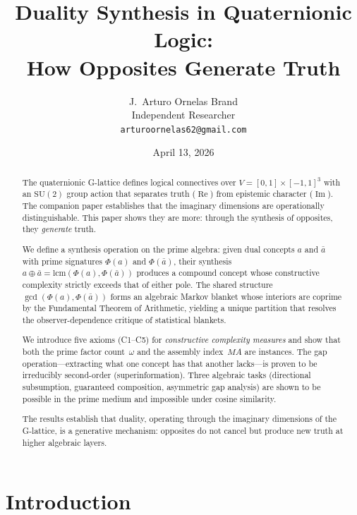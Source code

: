 \documentclass[11pt,a4paper]{article}
\title{Duality Synthesis in Quaternionic Logic:\\
How Opposites Generate Truth}
\author{J.~Arturo Ornelas Brand\\
  \small Independent Researcher\\
  \small \texttt{arturoornelas62@gmail.com}}
\date{April 13, 2026}
\newcommand{\Real}{\operatorname{Re}}
\newcommand{\Imag}{\operatorname{Im}}
\newcommand{\SU}{\mathrm{SU}(2)}
\begin{document}
\maketitle

\begin{abstract}
The quaternionic G-lattice defines logical connectives over
$V=[0,1]\times[-1,1]^3$ with an $\SU$ group action that separates
truth ($\Real$) from epistemic character ($\Imag$). The companion
paper establishes that the imaginary dimensions are operationally
distinguishable. This paper shows they are more: through the
synthesis of opposites, they \emph{generate} truth.

We define a synthesis operation on the prime algebra: given dual
concepts $a$ and $\bar{a}$ with prime signatures $\Phi(a)$ and
$\Phi(\bar{a})$, their synthesis
$a\oplus\bar{a}=\mathrm{lcm}(\Phi(a),\Phi(\bar{a}))$ produces a
compound concept whose constructive complexity strictly exceeds that
of either pole. The shared structure $\gcd(\Phi(a),\Phi(\bar{a}))$
forms an algebraic Markov blanket whose interiors are coprime by
the Fundamental Theorem of Arithmetic, yielding a unique partition
that resolves the observer-dependence critique of statistical blankets.

We introduce five axioms (C1--C5) for \emph{constructive complexity
measures} and show that both the prime factor count~$\omega$ and the
assembly index~$MA$ are instances. The gap
operation---extracting what one concept has that another lacks---is
proven to be irreducibly second-order (superinformation). Three
algebraic tasks (directional subsumption, guaranteed composition,
asymmetric gap analysis) are shown to be possible in the prime
medium and impossible under cosine similarity.

The results establish that duality, operating through the imaginary
dimensions of the G-lattice, is a generative mechanism: opposites
do not cancel but produce new truth at higher algebraic layers.
\end{abstract}

\section{Introduction}
\label{sec:intro}
\end{document}

